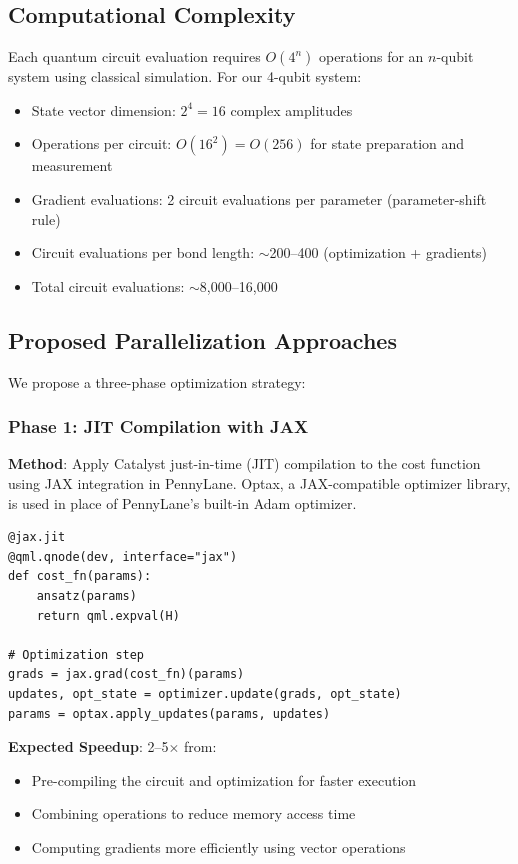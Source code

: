 \documentclass[11pt]{article}
\begin{document}
\subsection{Computational Complexity}

Each quantum circuit evaluation requires $O(4^n)$ operations for an $n$-qubit system using classical simulation. For our 4-qubit system:

\begin{itemize}
    \item State vector dimension: $2^4 = 16$ complex amplitudes
    \item Operations per circuit: $O(16^2) = O(256)$ for state preparation and measurement
    \item Gradient evaluations: 2 circuit evaluations per parameter (parameter-shift rule)
    \item Circuit evaluations per bond length: $\sim$200--400 (optimization + gradients)
    \item Total circuit evaluations: $\sim$8,000--16,000
\end{itemize}

\subsection{Proposed Parallelization Approaches}

We propose a three-phase optimization strategy:

\subsubsection{Phase 1: JIT Compilation with JAX}

\textbf{Method}: Apply Catalyst just-in-time (JIT) compilation to the cost function using JAX integration in PennyLane.
Optax, a JAX-compatible optimizer library, is used in place of PennyLane's built-in Adam optimizer.

\begin{lstlisting}[caption={JIT-compiled VQE cost function with Optax optimizer.}]
@jax.jit
@qml.qnode(dev, interface="jax")
def cost_fn(params):
    ansatz(params)
    return qml.expval(H)

# Optimization step
grads = jax.grad(cost_fn)(params)
updates, opt_state = optimizer.update(grads, opt_state)
params = optax.apply_updates(params, updates)
\end{lstlisting}

\textbf{Expected Speedup}: 2--5$\times$ from:
\begin{itemize}
    \item Pre-compiling the circuit and optimization for faster execution
    \item Combining operations to reduce memory access time
    \item Computing gradients more efficiently using vector operations
\end{itemize}
\end{document}
